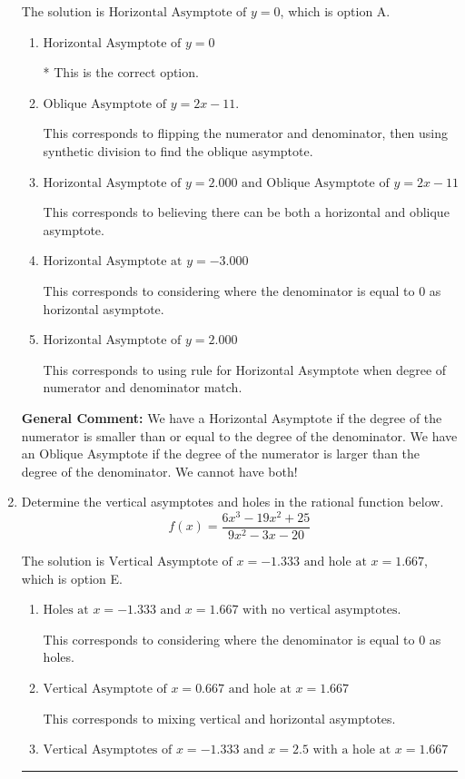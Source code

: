 \documentclass{extbook}[14pt]
\newcommand{\litem}[1]{\item #1

\rule{\textwidth}{0.4pt}}
\begin{document}
\begin{enumerate}
{The solution is \( \text{Horizontal Asymptote of } y = 0 \), which is option A.\begin{enumerate}[label=\Alph*.]
\item \( \text{Horizontal Asymptote of } y = 0 \)

* This is the correct option.
\item \( \text{Oblique Asymptote of } y = 2x -11. \)

This corresponds to flipping the numerator and denominator, then using synthetic division to find the oblique asymptote.
\item \( \text{Horizontal Asymptote of } y = 2.000 \text{ and Oblique Asymptote of } y = 2x -11 \)

This corresponds to believing there can be both a horizontal and oblique asymptote.
\item \( \text{Horizontal Asymptote at } y = -3.000 \)

This corresponds to considering where the denominator is equal to 0 as horizontal asymptote.
\item \( \text{Horizontal Asymptote of } y = 2.000  \)

This corresponds to using rule for Horizontal Asymptote when degree of numerator and denominator match.
\end{enumerate}

\textbf{General Comment:} We have a Horizontal Asymptote if the degree of the numerator is smaller than or equal to the degree of the denominator. We have an Oblique Asymptote if the degree of the numerator is larger than the degree of the denominator. We cannot have both!
}
\litem{
Determine the vertical asymptotes and holes in the rational function below.
\[ f(x) = \frac{6x^{3} -19 x^{2} + 25}{9x^{2} -3 x -20} \]

The solution is \( \text{Vertical Asymptote of } x = -1.333 \text{ and hole at } x = 1.667 \), which is option E.\begin{enumerate}[label=\Alph*.]
\item \( \text{Holes at } x = -1.333 \text{ and } x = 1.667 \text{ with no vertical asymptotes.} \)

This corresponds to considering where the denominator is equal to 0 as holes.
\item \( \text{Vertical Asymptote of } x = 0.667 \text{ and hole at } x = 1.667 \)

This corresponds to mixing vertical and horizontal asymptotes.
\item \( \text{Vertical Asymptotes of } x = -1.333 \text{ and } x = 2.5 \text{ with a hole at } x = 1.667 \)


\end{enumerate}}
\end{enumerate}
\end{document}
